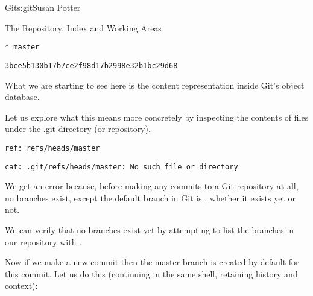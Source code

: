 \begin{aosachapter}{Git}{s:git}{Susan Potter}
\begin{aosasect1}{The Repository, Index and Working Areas}
\begin{aosaitemize}
  \item {}
  \item {}
\begin{verbatim}
* master
\end{verbatim}
  \item {}
\begin{verbatim}
3bce5b130b17b7ce2f98d17b2998e32b1bc29d68
\end{verbatim}
  \item {}
\end{aosaitemize}

What we are starting to see here is the content representation inside Git's
object database.

Let us explore what this means more concretely by inspecting the contents of
files under the .git directory (or repository).

\begin{aosaitemize}
  \item {}
  \item {}
\begin{verbatim}
ref: refs/heads/master
\end{verbatim}
  \item {}
  \item {}
\begin{verbatim}
cat: .git/refs/heads/master: No such file or directory
\end{verbatim}
\end{aosaitemize}

We get an error because, before making any commits to a Git repository at
all, no branches exist, except the default branch in Git is ,
whether it exists yet or not.

We can verify that no branches exist yet by attempting to list the branches
in our repository with .

Now if we make a new commit then the master branch is created by default for
this commit. Let us do this (continuing in the same shell, retaining
history and context):


\end{aosasect1}
\end{aosachapter}
